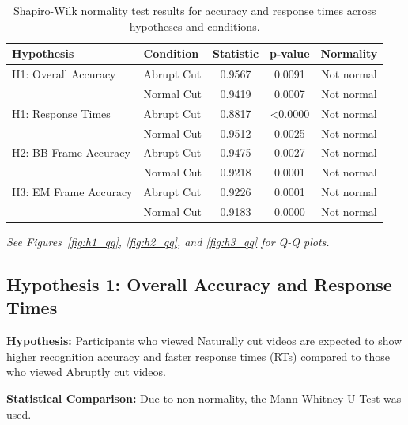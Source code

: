 \documentclass[11pt, a4paper]{article}
\begin{document}
\begin{table}[ht]
    \centering
    \begin{tabular}{l l c c c}
        \toprule
        \textbf{Hypothesis} & \textbf{Condition} & \textbf{Statistic} & \textbf{p-value} & \textbf{Normality} \\
        \midrule
        H1: Overall Accuracy      & Abrupt Cut  & 0.9567 & 0.0091    & Not normal \\
                                  & Normal Cut & 0.9419 & 0.0007    & Not normal \\
        \addlinespace
        H1: Response Times        & Abrupt Cut  & 0.8817 & <0.0000   & Not normal \\
                                  & Normal Cut & 0.9512 & 0.0025    & Not normal \\
        \addlinespace
        H2: BB Frame Accuracy     & Abrupt Cut  & 0.9475 & 0.0027    & Not normal \\
                                  & Normal Cut & 0.9218 & 0.0001    & Not normal \\
        \addlinespace
        H3: EM Frame Accuracy     & Abrupt Cut  & 0.9226 & 0.0001    & Not normal \\
                                  & Normal Cut & 0.9183 & 0.0000    & Not normal \\
        \bottomrule
    \end{tabular}
    \caption{Shapiro-Wilk normality test results for accuracy and response times across hypotheses and conditions.}
    \label{tab:normality}
\end{table}

\emph{See Figures~\ref{fig:h1_qq}, \ref{fig:h2_qq}, and \ref{fig:h3_qq} for Q-Q plots.}


\subsection{Hypothesis 1: Overall Accuracy and Response Times}
\textbf{Hypothesis:} Participants who viewed Naturally cut videos are expected to show higher recognition accuracy and faster response times (RTs) compared to those who viewed Abruptly cut videos.

\textbf{Statistical Comparison:} Due to non-normality, the Mann-Whitney U Test was used.
\end{document}
